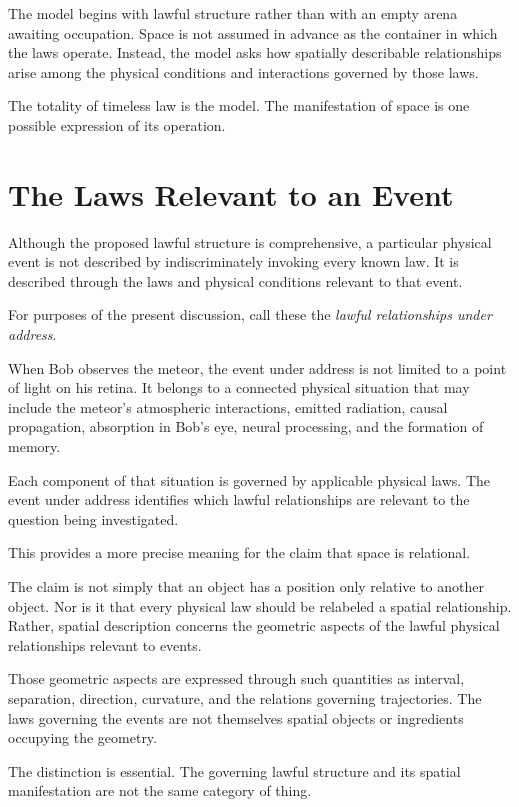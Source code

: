 \documentclass[12pt,onecolumn]{article}
\begin{document}
The model begins with lawful structure rather than with an empty arena awaiting occupation. Space is not assumed in advance as the container in which the laws operate. Instead, the model asks how spatially describable relationships arise among the physical conditions and interactions governed by those laws.

The totality of timeless law is the model. The manifestation of space is one possible expression of its operation.

\section{The Laws Relevant to an Event}

Although the proposed lawful structure is comprehensive, a particular physical event is not described by indiscriminately invoking every known law. It is described through the laws and physical conditions relevant to that event.

For purposes of the present discussion, call these the \emph{lawful relationships under address}.

When Bob observes the meteor, the event under address is not limited to a point of light on his retina. It belongs to a connected physical situation that may include the meteor's atmospheric interactions, emitted radiation, causal propagation, absorption in Bob's eye, neural processing, and the formation of memory.

Each component of that situation is governed by applicable physical laws. The event under address identifies which lawful relationships are relevant to the question being investigated.

This provides a more precise meaning for the claim that space is relational.

The claim is not simply that an object has a position only relative to another object. Nor is it that every physical law should be relabeled a spatial relationship. Rather, spatial description concerns the geometric aspects of the lawful physical relationships relevant to events.

Those geometric aspects are expressed through such quantities as interval, separation, direction, curvature, and the relations governing trajectories. The laws governing the events are not themselves spatial objects or ingredients occupying the geometry.

The distinction is essential. The governing lawful structure and its spatial manifestation are not the same category of thing.
\end{document}
